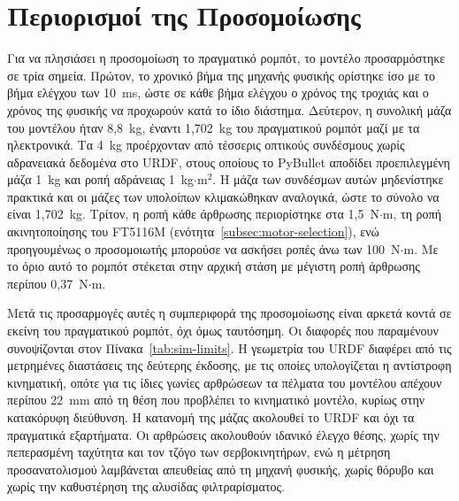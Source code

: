 \documentclass[11pt]{report}
\begin{document}
\section{Περιορισμοί της Προσομοίωσης}
\label{sec:sim-limits}
Για να πλησιάσει η προσομοίωση το πραγματικό ρομπότ, το μοντέλο προσαρμόστηκε
σε τρία σημεία. Πρώτον, το χρονικό βήμα της μηχανής φυσικής ορίστηκε ίσο με το
βήμα ελέγχου των 10~ms, ώστε σε κάθε βήμα ελέγχου ο χρόνος της τροχιάς και ο
χρόνος της φυσικής να προχωρούν κατά το ίδιο διάστημα. Δεύτερον, η συνολική
μάζα του μοντέλου ήταν 8,8~kg, έναντι 1,702~kg του πραγματικού ρομπότ μαζί με
τα ηλεκτρονικά. Τα 4~kg προέρχονταν από τέσσερις οπτικούς συνδέσμους χωρίς
αδρανειακά δεδομένα στο URDF, στους οποίους το PyBullet αποδίδει προεπιλεγμένη
μάζα 1~kg και ροπή αδράνειας 1~kg$\cdot$m$^2$. Η μάζα των συνδέσμων αυτών
μηδενίστηκε πρακτικά και οι μάζες των υπολοίπων κλιμακώθηκαν αναλογικά, ώστε το
σύνολο να είναι 1,702~kg. Τρίτον, η ροπή κάθε άρθρωσης περιορίστηκε στα
1,5~N$\cdot$m, τη ροπή ακινητοποίησης του FT5116M
(ενότητα~\ref{subsec:motor-selection}), ενώ προηγουμένως ο προσομοιωτής
μπορούσε να ασκήσει ροπές άνω των 100~N$\cdot$m. Με το όριο αυτό το ρομπότ
στέκεται στην αρχική στάση με μέγιστη ροπή άρθρωσης περίπου 0,37~N$\cdot$m.

Μετά τις προσαρμογές αυτές η συμπεριφορά της προσομοίωσης είναι αρκετά κοντά
σε εκείνη του πραγματικού ρομπότ, όχι όμως ταυτόσημη. Οι διαφορές που
παραμένουν συνοψίζονται στον Πίνακα~\ref{tab:sim-limits}. Η γεωμετρία του URDF
διαφέρει από τις μετρημένες διαστάσεις της δεύτερης έκδοσης, με τις οποίες
υπολογίζεται η αντίστροφη κινηματική, οπότε για τις ίδιες γωνίες αρθρώσεων τα
πέλματα του μοντέλου απέχουν περίπου 22~mm από τη θέση που προβλέπει το
κινηματικό μοντέλο, κυρίως στην κατακόρυφη διεύθυνση. Η κατανομή της μάζας
ακολουθεί το URDF και όχι τα πραγματικά εξαρτήματα. Οι αρθρώσεις ακολουθούν
ιδανικό έλεγχο θέσης, χωρίς την πεπερασμένη ταχύτητα και τον τζόγο των
σερβοκινητήρων, ενώ η μέτρηση προσανατολισμού λαμβάνεται απευθείας από τη
μηχανή φυσικής, χωρίς θόρυβο και χωρίς την καθυστέρηση της αλυσίδας
φιλτραρίσματος.
\end{document}
